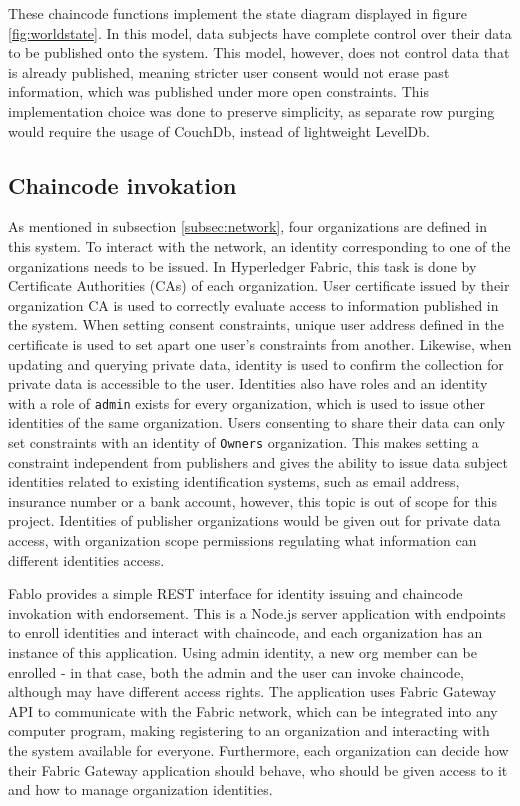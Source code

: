 \documentclass[12pt]{article}
\begin{document}
    These chaincode functions implement the state diagram displayed in figure \ref{fig:worldstate}. In this model, data subjects have complete control over their data to be published onto the system. This model, however, does not control data that is already published, meaning stricter user consent would not erase past information, which was published under more open constraints. This implementation choice was done to preserve simplicity, as separate row purging would require the usage of CouchDb, instead of lightweight LevelDb.


    \subsection{Chaincode invokation}
    As mentioned in subsection \ref{subsec:network}, four organizations are defined in this system. To interact with the network, an identity corresponding to one of the organizations needs to be issued. In Hyperledger Fabric, this task is done by Certificate Authorities (CAs) of each organization. User certificate issued by their organization CA is used to correctly evaluate access to information published in the system. When setting consent constraints, unique user address defined in the certificate is used to set apart one user's constraints from another. Likewise, when updating and querying private data, identity is used to confirm the collection for private data is accessible to the user. Identities also have roles and an identity with a role of \lstinline{admin} exists for every organization, which is used to issue other identities of the same organization. Users consenting to share their data can only set constraints with an identity of \lstinline{Owners} organization. This makes setting a constraint independent from publishers and gives the ability to issue data subject identities related to existing identification systems, such as email address, insurance number or a bank account, however, this topic is out of scope for this project. Identities of publisher organizations would be given out for private data access, with organization scope permissions regulating what information can different identities access.

    Fablo provides a simple REST interface for identity issuing and chaincode invokation with endorsement. This is a Node.js server application with endpoints to enroll identities and interact with chaincode, and each organization has an instance of this application. Using admin identity, a new org member can be enrolled - in that case, both the admin and the user can invoke chaincode, although may have different access rights. The application uses Fabric Gateway API to communicate with the Fabric network, which can be integrated into any computer program, making registering to an organization and interacting with the system available for everyone. Furthermore, each organization can decide how their Fabric Gateway application should behave, who should be given access to it and how to manage organization identities.
\end{document}
